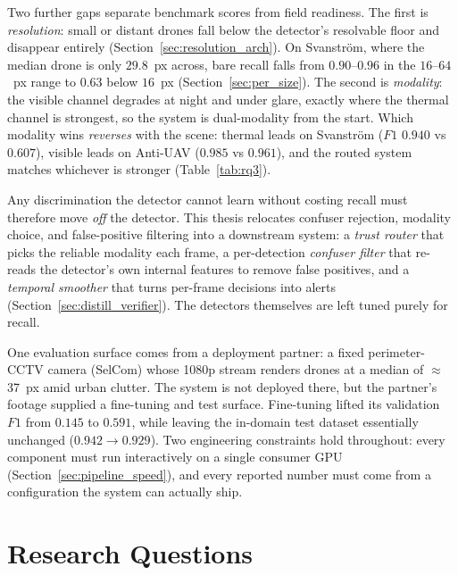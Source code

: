 Two further gaps separate benchmark scores from field readiness. The first is \emph{resolution}: small or distant drones fall below the detector's resolvable floor and disappear entirely (Section~\ref{sec:resolution_arch}). On Svanstr\"om, where the median drone is only $29.8$~px across, bare recall falls from $0.90$--$0.96$ in the $16$--$64$~px range to $0.63$ below $16$~px (Section~\ref{sec:per_size}). The second is \emph{modality}: the visible channel degrades at night and under glare, exactly where the thermal channel is strongest, so the system is dual-modality from the start. Which modality wins \emph{reverses} with the scene: thermal leads on Svanstr\"om ($F1$ $0.940$ vs $0.607$), visible leads on Anti-UAV ($0.985$ vs $0.961$), and the routed system matches whichever is stronger (Table~\ref{tab:rq3}).

Any discrimination the detector cannot learn without costing recall must therefore move \emph{off} the detector. This thesis relocates confuser rejection, modality choice, and false-positive filtering into a downstream system: a \emph{trust router} that picks the reliable modality each frame, a per-detection \emph{confuser filter} that re-reads the detector's own internal features to remove false positives, and a \emph{temporal smoother} that turns per-frame decisions into alerts (Section~\ref{sec:distill_verifier}). The detectors themselves are left tuned purely for recall.

One evaluation surface comes from a deployment partner: a fixed perimeter-CCTV camera (SelCom) whose 1080p stream renders drones at a median of $\approx$37~px amid urban clutter. The system is not deployed there, but the partner's footage supplied a fine-tuning and test surface. Fine-tuning lifted its validation $F1$ from $0.145$ to $0.591$, while leaving the in-domain test dataset essentially unchanged ($0.942 \to 0.929$). Two engineering constraints hold throughout: every component must run interactively on a single consumer GPU (Section~\ref{sec:pipeline_speed}), and every reported number must come from a configuration the system can actually ship.

\section{Research Questions}
\label{sec:rqs}


